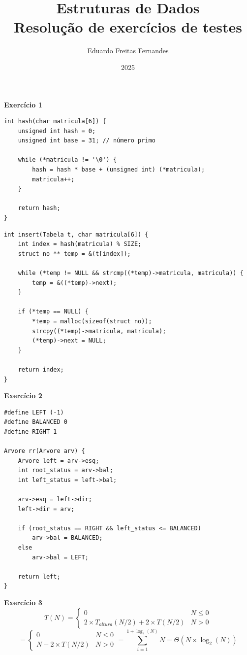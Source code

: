 \documentclass[a4paper,11pt]{article}
\title{Estruturas de Dados\\ Resolução de exercícios de testes}
\author{Eduardo Freitas Fernandes}
\date{2025}
\begin{document}
	
\maketitle
	
	
\noindent \textbf{Exercício 1}

\begin{verbatim}
int hash(char matricula[6]) {
	unsigned int hash = 0;
	unsigned int base = 31; // número primo
	
	while (*matricula != '\0') {
		hash = hash * base + (unsigned int) (*matricula);
		matricula++;
	}
	
	return hash;
}
\end{verbatim}

\begin{verbatim}
int insert(Tabela t, char matricula[6]) {
	int index = hash(matricula) % SIZE;
	struct no ** temp = &(t[index]);
	
	while (*temp != NULL && strcmp((*temp)->matricula, matricula)) {
		temp = &((*temp)->next);
	}
	
	if (*temp == NULL) {
		*temp = malloc(sizeof(struct no));
		strcpy((*temp)->matricula, matricula);
		(*temp)->next = NULL;
	}
	
	return index;
}
\end{verbatim}

	
\noindent \textbf{Exercício 2}

\begin{verbatim}
#define LEFT (-1)
#define BALANCED 0
#define RIGHT 1

Arvore rr(Arvore arv) {
	Arvore left = arv->esq;
	int root_status = arv->bal;
	int left_status = left->bal;
	
	arv->esq = left->dir;
	left->dir = arv;
	
	if (root_status == RIGHT && left_status <= BALANCED)
		arv->bal = BALANCED;
	else
		arv->bal = LEFT;
	
	return left;
}
\end{verbatim}

	
\noindent \textbf{Exercício 3}\\
\[
	T(N) =
	\begin{cases}
		0 & N \leq 0 \\
		2 \times T_{altura}(N/2) + 2 \times T(N/2) & N > 0
	\end{cases}
\]
\[
	=
	\begin{cases}
		0 & N \leq 0 \\
		N + 2 \times T(N/2) & N > 0
	\end{cases}
	= \sum_{i=1}^{1+\log_2(N)} N = \Theta(N \times \log_2(N))
\]
	
\end{document}
